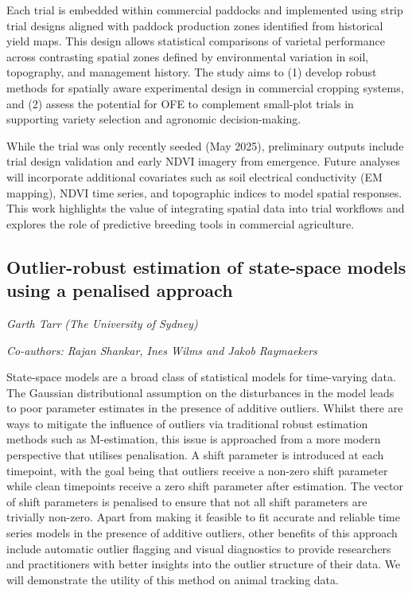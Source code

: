 \documentclass[
]{scrreprt}
\begin{document}
Each trial is embedded within commercial paddocks and implemented using
strip trial designs aligned with paddock production zones identified
from historical yield maps. This design allows statistical comparisons
of varietal performance across contrasting spatial zones defined by
environmental variation in soil, topography, and management history. The
study aims to (1) develop robust methods for spatially aware
experimental design in commercial cropping systems, and (2) assess the
potential for OFE to complement small-plot trials in supporting variety
selection and agronomic decision-making.

While the trial was only recently seeded (May 2025), preliminary outputs
include trial design validation and early NDVI imagery from emergence.
Future analyses will incorporate additional covariates such as soil
electrical conductivity (EM mapping), NDVI time series, and topographic
indices to model spatial responses. This work highlights the value of
integrating spatial data into trial workflows and explores the role of
predictive breeding tools in commercial agriculture.

\subsection{Outlier-robust estimation of state-space models using a
penalised
approach}\label{outlier-robust-estimation-of-state-space-models-using-a-penalised-approach}

\emph{Garth Tarr} \emph{(The University of Sydney)}

\emph{Co-authors: Rajan Shankar, Ines Wilms and Jakob Raymaekers}

\setlength{\parskip}{0.5em}

State-space models are a broad class of statistical models for
time-varying data. The Gaussian distributional assumption on the
disturbances in the model leads to poor parameter estimates in the
presence of additive outliers. Whilst there are ways to mitigate the
influence of outliers via traditional robust estimation methods such as
M-estimation, this issue is approached from a more modern perspective
that utilises penalisation. A shift parameter is introduced at each
timepoint, with the goal being that outliers receive a non-zero shift
parameter while clean timepoints receive a zero shift parameter after
estimation. The vector of shift parameters is penalised to ensure that
not all shift parameters are trivially non-zero. Apart from making it
feasible to fit accurate and reliable time series models in the presence
of additive outliers, other benefits of this approach include automatic
outlier flagging and visual diagnostics to provide researchers and
practitioners with better insights into the outlier structure of their
data. We will demonstrate the utility of this method on animal tracking
data.
\end{document}
